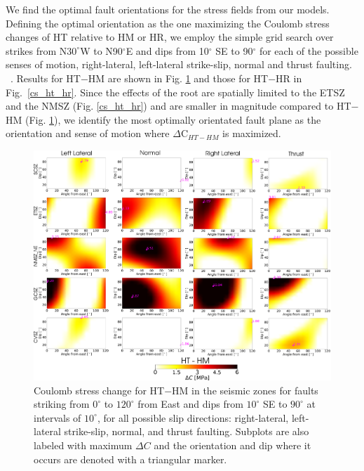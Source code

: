 \documentclass[draft,linenumbers]{agujournal2018}
\begin{document}
     We find the optimal fault orientations for the stress fields from our models. Defining the optimal orientation as the one maximizing the Coulomb stress changes of HT relative to HM or HR, we employ the simple grid search over strikes from N$30^\circ$W to N90$^\circ$E and dips from 10$^\circ$ SE to 90$^\circ$
     for each of the possible senses of motion, right-lateral, left-lateral strike-slip, normal and thrust faulting. ~\citep{shumway2008focal, hurd2012intraplate, johnson2014earthquake, cooley2015new}. Results for HT$-$HM are shown in Fig. \ref{cs_ht_hm} and those for HT$-$HR in Fig.~\ref{cs_ht_hr}.  Since the effects of the root are spatially limited to the ETSZ and the NMSZ (Fig. \ref{cs_ht_hr}) and are smaller in magnitude compared to HT$-$HM (Fig. \ref{cs_ht_hm}), we identify the most optimally orientated fault plane as the orientation and sense of motion where $\Delta$C$_{HT-HM}$ is maximized.
\begin{figure}[ht]
    \centering
    \includegraphics[width=\linewidth]{figures/ht_hm_summ.png}
    \caption{Coulomb stress change for HT$-$HM in the seismic zones for faults striking from $0^\circ$ to $120^\circ$ from East and dips from $10^\circ$ SE to $90^\circ$ at intervals of $10^\circ$, for all possible slip directions: right-lateral, left-lateral strike-slip, normal, and thrust faulting. Subplots are also labeled with maximum $\Delta C$ and the orientation and dip where it occurs are denoted with a triangular marker.}
    \label{cs_ht_hm}
\end{figure}
\end{document}
